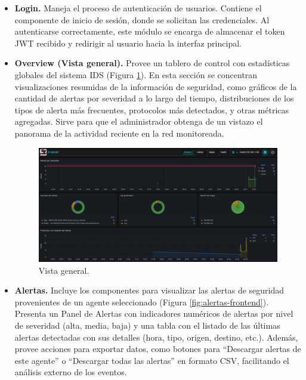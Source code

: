 \documentclass[11pt,a4paper,twoside]{report}
\begin{document}
\begin{itemize}
	\item \textbf{Login.} Maneja el proceso de autenticación de usuarios. Contiene el componente de inicio de sesión, donde se solicitan las credenciales. Al autenticarse correctamente, este módulo se encarga de almacenar el token JWT recibido y redirigir al usuario hacia la interfaz principal.
	
	\item \textbf{Overview (Vista general).} Provee un tablero de control con estadísticas globales del sistema IDS (Figura \ref{fig:overview-frontend}). En esta sección se concentran visualizaciones resumidas de la información de seguridad, como gráficos de la cantidad de alertas por severidad a lo largo del tiempo, distribuciones de los tipos de alerta más frecuentes, protocolos más detectados, y otras métricas agregadas. Sirve para que el administrador obtenga de un vistazo el panorama de la actividad reciente en la red monitoreada.

	\begin{figure}[H]
		\centering
		\includegraphics[width=1\textwidth]{documento/overview.png}
		\caption{Vista general.}
		\label{fig:overview-frontend}
	\end{figure}
	
	\item \textbf{Alertas.} Incluye los componentes para visualizar las alertas de seguridad provenientes de un agente seleccionado (Figura \ref{fig:alertas-frontend}). Presenta un Panel de Alertas con indicadores numéricos de alertas por nivel de severidad (alta, media, baja) y una tabla con el listado de las últimas alertas detectadas con sus detalles (hora, tipo, origen, destino, etc.). Además, provee acciones para exportar datos, como botones para ``Descargar alertas de este agente'' o ``Descargar todas las alertas'' en formato CSV, facilitando el análisis externo de los eventos.
	

\end{itemize}
\end{document}
